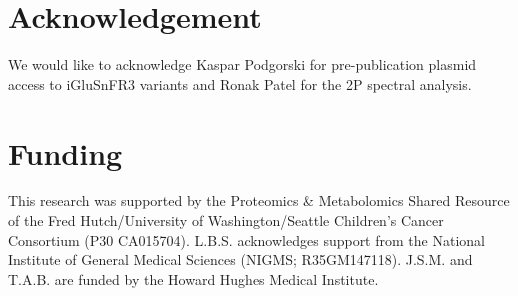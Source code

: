 \section{Acknowledgement}
We would like to acknowledge Kaspar Podgorski for pre-publication plasmid access to iGluSnFR3 variants and Ronak Patel for the 2P spectral analysis.

\section{Funding}
This research was supported by the Proteomics \& Metabolomics Shared Resource of the Fred Hutch/University of Washington/Seattle Children’s Cancer Consortium (P30 CA015704).
L.B.S. acknowledges support from the National Institute of General Medical Sciences (NIGMS; R35GM147118).
J.S.M. and T.A.B. are funded by the Howard Hughes Medical Institute.

